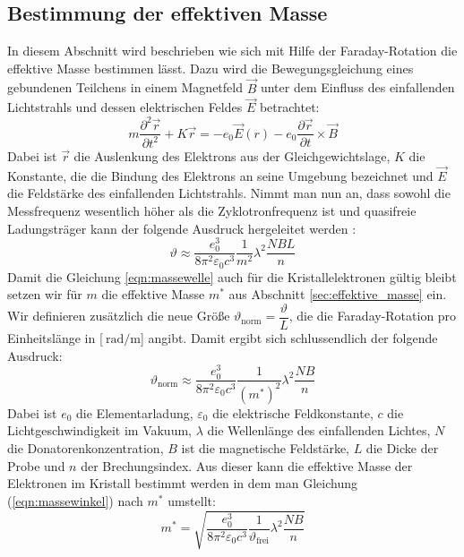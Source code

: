 \subsection{Bestimmung der effektiven Masse}
\label{sec:effektivemasse}
In diesem Abschnitt wird beschrieben wie sich mit Hilfe der Faraday-Rotation die effektive Masse bestimmen lässt. Dazu wird die Bewegungsgleichung eines gebundenen Teilchens in einem Magnetfeld $\vec{B}$ unter dem Einfluss des einfallenden Lichtstrahls und dessen elektrischen Feldes $\vec{E}$ betrachtet:
\begin{equation}
  \label{eqn:bewegung}
  m\dfrac{\partial^2\vec{r}}{\partial t^2}+K\vec{r}=-e_\mathrm{0}\vec{E}(r)-e_\mathrm{0}\dfrac{\partial \vec{r}}{\partial t}\times \vec{B}
\end{equation}
Dabei ist $\vec{r}$ die Auslenkung des Elektrons aus der Gleichgewichtslage, $K$ die Konstante, die die Bindung des Elektrons an seine Umgebung bezeichnet und $\vec{E}$ die Feldstärke des einfallenden Lichtstrahls. Nimmt man nun an, dass sowohl die Messfrequenz wesentlich höher als die Zyklotronfrequenz ist und quasifreie Ladungsträger kann der folgende Ausdruck hergeleitet werden \cite[5-8]{Anleitung}:
\begin{equation}
  \label{eqn:massewelle}
  \vartheta\approx\dfrac{e_\mathrm{0}^3}{8\pi^2\varepsilon_\mathrm{0}c^3}\dfrac{1}{m^2}\lambda^2\dfrac{NBL}{n}
\end{equation}
Damit die Gleichung \ref{eqn:massewelle} auch für die Kristallelektronen gültig bleibt setzen wir für $m$ die effektive Masse $m^*$ aus Abschnitt \ref{sec:effektive_masse} ein. Wir definieren zusätzlich die neue Größe $\vartheta_\mathrm{norm}=\dfrac{\vartheta}{L}$, die die Faraday-Rotation pro Einheitslänge in [$\SI{}{\radian\per\meter}$] angibt. Damit ergibt sich schlussendlich der folgende Ausdruck:
\begin{equation}
  \label{eqn:massewinkel}
  \vartheta_\mathrm{norm}\approx\dfrac{e_\mathrm{0}^3}{8\pi^2\varepsilon_\mathrm{0}c^3}\dfrac{1}{(m^*)^2}\lambda^2\dfrac{NB}{n}
\end{equation}
Dabei ist $e_\mathrm{0}$ die Elementarladung, $\varepsilon_\mathrm{0}$ die elektrische Feldkonstante, $c$ die Lichtgeschwindigkeit im Vakuum, $\lambda$ die Wellenlänge des einfallenden Lichtes, $N$ die Donatorenkonzentration, $B$ ist die magnetische Feldstärke, $L$ die Dicke der Probe und $n$ der Brechungsindex.
Aus dieser kann die effektive Masse der Elektronen im Kristall bestimmt werden in dem man Gleichung (\ref{eqn:massewinkel}) nach $m^*$ umstellt:
\begin{equation}
  \label{eqn:massefinal}
  m^*=\sqrt{\dfrac{e_\mathrm{0}^3}{8\pi^2\varepsilon_\mathrm{0}c^3}\dfrac{1}{\vartheta_\mathrm{frei}}\lambda^2\dfrac{NB}{n}}
\end{equation}

